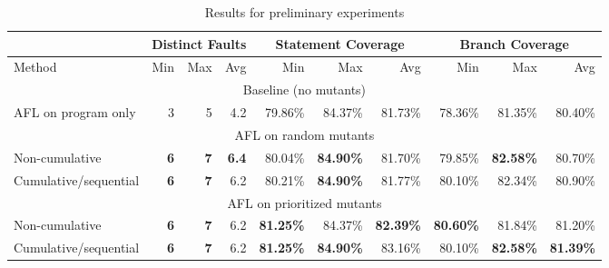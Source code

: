 \begin{table*}
  \renewcommand{\arraystretch}{1.3}
\caption{Results for preliminary experiments}
  
  \centering
  \begin{tabular}{l||r|r|r||r|r|r||r|r|r}
    & \multicolumn{3}{|c||}{Distinct Faults} & \multicolumn{3}{|c||}{Statement Coverage} &
                                                                    \multicolumn{3}{|c}{Branch Coverage} \\
    \hline
  Method & Min & Max  & Avg & Min & Max & Avg
                                                                  
  & Min & Max & Avg \\
    \hline
    \hline
   \multicolumn{10}{c}{Baseline (no mutants)} \\    
    \hline
  AFL on program only & 3 & 5 & 4.2 & 79.86\% & 84.37\% & 81.73\% &
                                                                    78.36\%
                                  & 81.35\% & 80.40\%\\
    \hline
    \hline
    \multicolumn{10}{c}{AFL on random mutants} \\
    \hline
 Non-cumulative  & {\bf 6} & {\bf 7} & {\bf 6.4} & 80.04\% &
                                                                   {\bf
                                                                                     84.90\%}
                      & 81.70\% & 79.85\% & {\bf 82.58\%} & 80.70\%\\
  \hline
 Cumulative/sequential & {\bf 6} & {\bf 7} & 6.2 & 80.21\%
                                                               &
                                                                 {\bf 84.90\%}
                      & 81.77\%
                            & 80.10\% & 82.34\% & 80.90\%\\
    \hline
    \hline
    \multicolumn{10}{c}{AFL on prioritized mutants} \\
    \hline
    Non-cumulative  & {\bf 6} & {\bf 7} & 6.2 &
                                                                {\bf 81.25\%}
               & 84.37\% & {\bf 82.39\%} & {\bf 80.60\%} & 81.84\% & 81.20\% \\
    \hline
   Cumulative/sequential  & {\bf 6} &
                                                                   {\bf 7} & 6.2 &
    {\bf 81.25\%} & {\bf 84.90\%} & 83.16\% & 80.10\% & {\bf 82.58\%} & {\bf 81.39\%}\\    
  \hline
  \end{tabular}
  \label{tab:prelim}

\end{table*}


